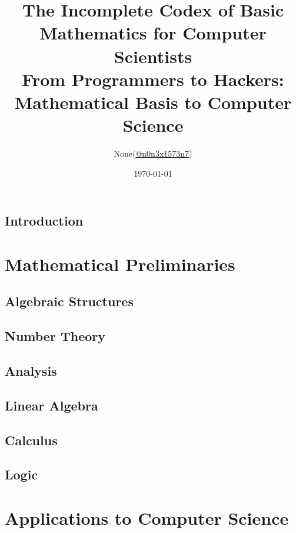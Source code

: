 \documentclass{report}
\title{
	The Incomplete Codex of Basic Mathematics for Computer Scientists\\
	\large From Programmers to Hackers: Mathematical Basis to Computer Science
}
\author{None(\href{https://www.twitter.com/n0n3x1573n7}{@n0n3x1573n7})}
\date{\today}
\theoremstyle{definition}
\begin{document}
	\maketitle

	\chapter{Introduction}
		
	
	\tableofcontents
	
	\part{Mathematical Preliminaries}
	
		\chapter{Algebraic Structures}
			
	
		\chapter{Number Theory}
			
	
		\chapter{Analysis}
			
		
		\chapter{Linear Algebra}
			
		
		\chapter{Calculus}
			
	
		\chapter{Logic}
			

	\part{Applications to Computer Science}
	
\end{document}
